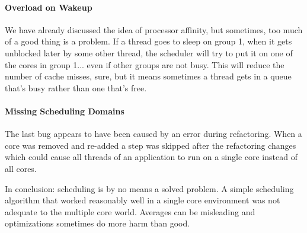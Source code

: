 \paragraph{Overload on Wakeup} We have already discussed the idea of processor affinity, but sometimes, too much of a good thing is a problem. If a thread goes to sleep on group 1, when it gets unblocked later by some other thread, the scheduler will try to put it on one of the cores in group 1... even if other groups are not busy. This will reduce the number of cache misses, sure, but it means sometimes a thread gets in a queue that's busy rather than one that's free.

\paragraph{Missing Scheduling Domains}
The last bug appears to have been caused by an error during refactoring. When a core was removed and re-added a step was skipped after the refactoring changes which could cause all threads of an application to run on a single core instead of all cores. 

In conclusion: scheduling is by no means a solved problem. A simple scheduling algorithm that worked reasonably well in a single core environment was not adequate to the multiple core world. Averages can be misleading and optimizations sometimes do more harm than good. 




